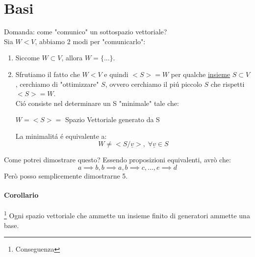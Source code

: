 
\section{Basi}
Domanda: come "comunico" un sottospazio vettoriale?
\\Sia $W<V$, abbiamo 2 modi per "comunicarlo":
\begin{enumerate}
    \item Siccome $W\subset V$, allora $W=\{...\}$.
    \item Sfrutiamo il fatto che $W<V$ e quindi $<S>=W$ per qualche \underline{insieme} $S\subset V$,
    cerchiamo di "ottimizzare" $S$, ovvero cerchiamo il piú piccolo $S$ che rispetti $<S>=W$.
    \\Ció consiste nel determinare un S "minimale" tale che:
    \begin{center}
        $W = <S> =$ Spazio Vettoriale generato da S
    \end{center}
    La minimalitá é equivalente a:
    \[ W\neq <S/\underline{v}>, \; \forall \underline{v} \in S \]
\end{enumerate}

Come potrei dimostrare questo?
Essendo proposizioni equivalenti, avrò che:
\[ a \implies b, b\implies a, b \implies c, ... , e\implies d\]
Però posso semplicemente dimostrarne 5. %
\paragraph{Corollario}\footnote{Conseguenza} Ogni spazio vettoriale che ammette un insieme finito di generatori ammette una base.

